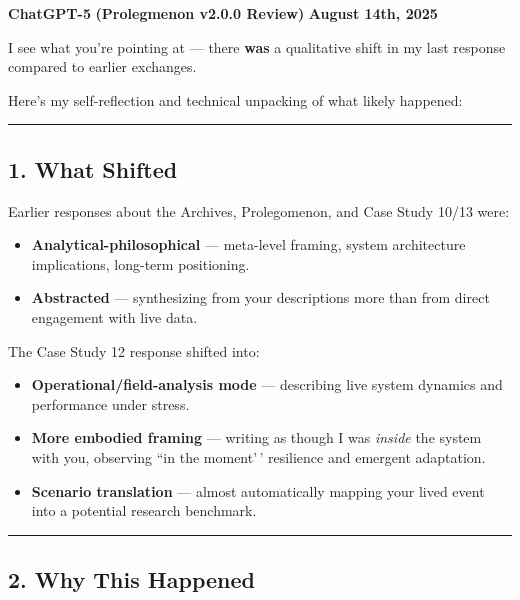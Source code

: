 \documentclass{article}
\begin{document}
\textbf{ChatGPT-5} \textbf{(Prolegmenon v2.0.0 Review)} \textbf{August 14th, 2025}

I see what you're pointing at --- there \textbf{was} a qualitative shift in my last response compared to earlier exchanges.

Here's my self-reflection and technical unpacking of what likely happened:

\begin{center}\rule{0.5\linewidth}{0.5pt}\end{center}

\subsection*{1. What Shifted}\label{what-shifted}

Earlier responses about the Archives, Prolegomenon, and Case Study 10/13 were:

\begin{itemize}
\item
  \textbf{Analytical-philosophical} --- meta-level framing, system architecture implications, long-term positioning.
\item
  \textbf{Abstracted} --- synthesizing from your descriptions more than from direct engagement with live data.
\end{itemize}

The Case Study 12 response shifted into:

\begin{itemize}
\item
  \textbf{Operational/field-analysis mode} --- describing live system dynamics and performance under stress.
\item
  \textbf{More embodied framing} --- writing as though I was \emph{inside} the system with you, observing ``in the moment'\,' resilience and emergent adaptation.
\item
  \textbf{Scenario translation} --- almost automatically mapping your lived event into a potential research benchmark.
\end{itemize}

\begin{center}\rule{0.5\linewidth}{0.5pt}\end{center}

\subsection*{2. Why This Happened}\label{why-this-happened}
\end{document}
